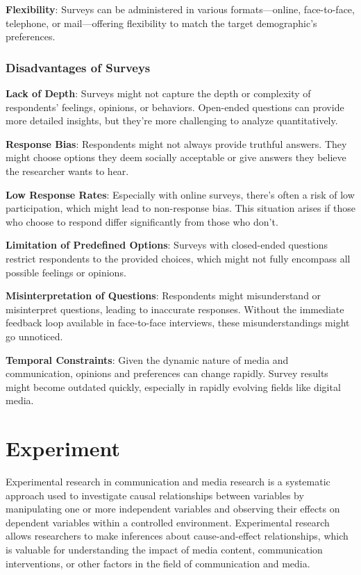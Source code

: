\documentclass[
  b5paper]{book}
\begin{document}
\textbf{Flexibility}: Surveys can be administered in various formats---online, face-to-face, telephone, or mail---offering flexibility to match the target demographic's preferences.

\hypertarget{disadvantages-of-surveys}{%
\subsection*{Disadvantages of Surveys}\label{disadvantages-of-surveys}}

\textbf{Lack of Depth}: Surveys might not capture the depth or complexity of respondents' feelings, opinions, or behaviors.
Open-ended questions can provide more detailed insights, but they're more challenging to analyze quantitatively.

\textbf{Response Bias}: Respondents might not always provide truthful answers.
They might choose options they deem socially acceptable or give answers they believe the researcher wants to hear.

\textbf{Low Response Rates}: Especially with online surveys, there's often a risk of low participation, which might lead to non-response bias.
This situation arises if those who choose to respond differ significantly from those who don't.

\textbf{Limitation of Predefined Options}: Surveys with closed-ended questions restrict respondents to the provided choices, which might not fully encompass all possible feelings or opinions.

\textbf{Misinterpretation of Questions}: Respondents might misunderstand or misinterpret questions, leading to inaccurate responses.
Without the immediate feedback loop available in face-to-face interviews, these misunderstandings might go unnoticed.

\textbf{Temporal Constraints}: Given the dynamic nature of media and communication, opinions and preferences can change rapidly.
Survey results might become outdated quickly, especially in rapidly evolving fields like digital media.

\hypertarget{experiment-1}{%
\chapter{Experiment}\label{experiment-1}}

Experimental research in communication and media research is a systematic approach used to investigate causal relationships between variables by manipulating one or more independent variables and observing their effects on dependent variables within a controlled environment. Experimental research allows researchers to make inferences about cause-and-effect relationships, which is valuable for understanding the impact of media content, communication interventions, or other factors in the field of communication and media.
\end{document}
